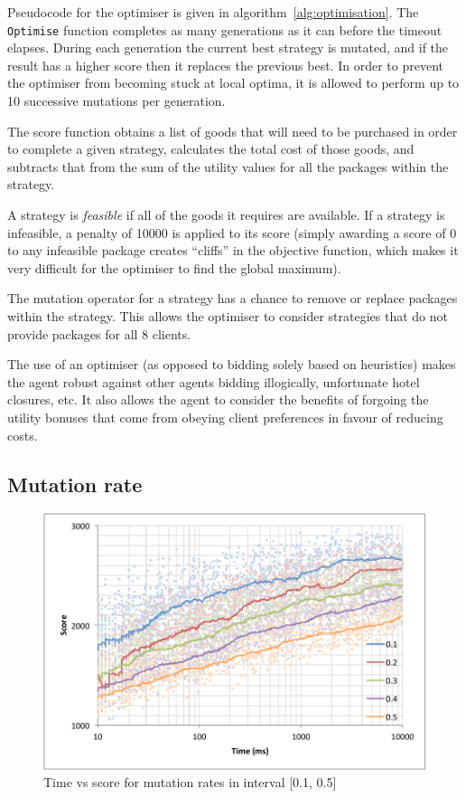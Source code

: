 \documentclass[a4paper]{proc}
\begin{document}
Pseudocode for the optimiser is given in algorithm~\ref{alg:optimisation}. The \texttt{Optimise} function completes as many generations as it can before the timeout elapses. During each generation the current best strategy is mutated, and if the result has a higher score then it replaces the previous best. In order to prevent the optimiser from becoming stuck at local optima, it is allowed to perform up to 10 successive mutations per generation.

The score function obtains a list of goods that will need to be purchased in order to complete a given strategy, calculates the total cost of those goods, and subtracts that from the sum of the utility values for all the packages within the strategy.

A strategy is \emph{feasible} if all of the goods it requires are available. If a strategy is infeasible, a penalty of 10000 is applied to its score (simply awarding a score of 0 to any infeasible package creates ``cliffs'' in the objective function, which makes it very difficult for the optimiser to find the global maximum).

The mutation operator for a strategy has a chance to remove or replace packages within the strategy. This allows the optimiser to consider strategies that do not provide packages for all 8 clients.

The use of an optimiser (as opposed to bidding solely based on heuristics) makes the agent robust against other agents bidding illogically, unfortunate hotel closures, etc. It also allows the agent to consider the benefits of forgoing the utility bonuses that come from obeying client preferences in favour of reducing costs.

\subsection{Mutation rate}

\begin{figure}
  \includegraphics[width=\linewidth]{mutation_rate_1.pdf}
  \caption{Time vs score for mutation rates in interval [0.1, 0.5]}
  \label{fig:mutation_rate_1}
\end{figure}
\end{document}
